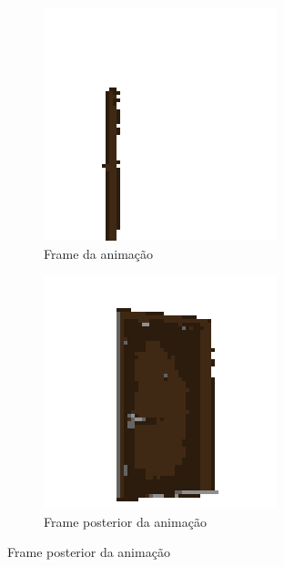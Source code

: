 \begin{figure}[htbp]
    \centering
    \caption{\small Frames da animação gerada pelo prompt 2}
    \label{fig:pixieHaus2}
    \begin{subfigure}{0.45\linewidth}
        \includegraphics[width=1\linewidth]{figs/pixieHaus/1frame1.PNG}
        \caption{\small Frame da animação}
        \label{fig:pixieHaus2a}
    \end{subfigure}
    \begin{subfigure}{0.45\linewidth}
        \includegraphics[width=1\linewidth]{figs/pixieHaus/1frame2.PNG}
        \caption{\small Frame posterior da animação}
        \label{fig:pixieHaus2b}
    \end{subfigure}
\end{figure}

